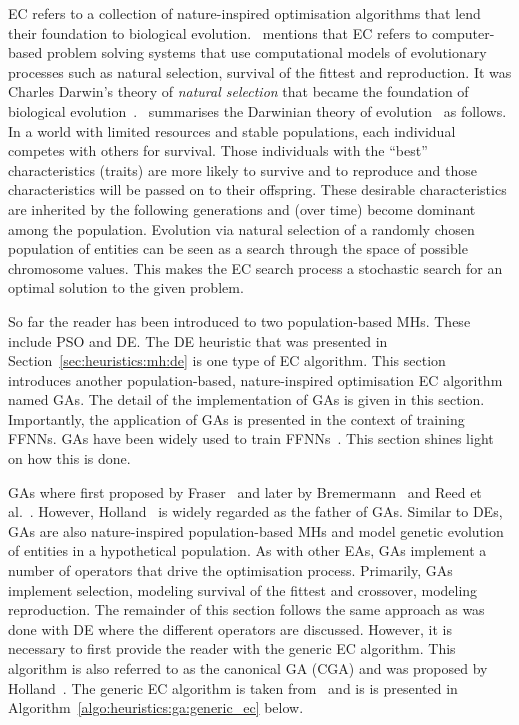 \Ac{EC} refers to a collection of nature-inspired optimisation algorithms that lend their foundation to biological evolution.~\citeauthor{ref:engelbrecht:2007}\cite{ref:engelbrecht:2007} mentions that \acs{EC} refers to computer-based problem solving systems that use computational models of evolutionary processes such as natural selection, survival of the fittest and reproduction. It was Charles Darwin's theory of \textit{natural selection} that became the foundation of biological evolution~\cite{ref:darwin:1987}.~\citeauthor{ref:engelbrecht:2007}\cite{ref:engelbrecht:2007} summarises the Darwinian theory of evolution~\cite{ref:darwin:2012} as follows. In a world with limited resources and stable populations, each individual competes with others for survival. Those individuals with the ``best'' characteristics (traits) are more likely to survive and to reproduce and those characteristics will be passed on to their offspring. These desirable characteristics are inherited by the following generations and (over time) become dominant among the population. Evolution via natural selection of a randomly chosen population of entities can be seen as a search through the space of possible chromosome values. This makes the \acs{EC} search process a stochastic search for an optimal solution to the given problem.

So far the reader has been introduced to two population-based \acp{MH}. These include \acs{PSO} and \acs{DE}. The \acs{DE} heuristic that was presented in Section~\ref{sec:heuristics:mh:de} is one type of \acs{EC} algorithm. This section introduces another population-based, nature-inspired optimisation \acs{EC} algorithm named \aclp{GA}. The detail of the implementation of \acp{GA} is given in this section. Importantly, the application of \acp{GA} is presented in the context of training \acp{FFNN}. \acp{GA} have been widely used to train \acp{FFNN}~\cite{ref:montana:1989}\cite{ref:siddique:2001}\cite{ref:miller:1989}. This section shines light on how this is done.

\Acp{GA} where first proposed by Fraser~\cite{ref:fraser:1957} and later by Bremermann~\cite{ref:bremermann:1962} and Reed et al.~\cite{ref:reed:1967}. However, Holland~\cite{ref:holland:1992} is widely regarded as the father of \acp{GA}. Similar to \acp{DE}, \acp{GA} are also nature-inspired population-based \acp{MH} and model genetic evolution of entities in a hypothetical population. As with other \acp{EA}, \acp{GA} implement a number of operators that drive the optimisation process.  Primarily, \acp{GA} implement selection, modeling survival of the fittest and crossover, modeling reproduction. The remainder of this section follows the same approach as was done with \acs{DE} where the different operators are discussed. However, it is necessary to first provide the reader with the generic \acs{EC} algorithm. This algorithm is also referred to as the canonical \acs{GA} (CGA) and was proposed by Holland~\cite{ref:holland:1992}. The generic \acs{EC} algorithm is taken from~\cite{ref:engelbrecht:2007} and is is presented in Algorithm~\ref{algo:heuristics:ga:generic_ec} below.

